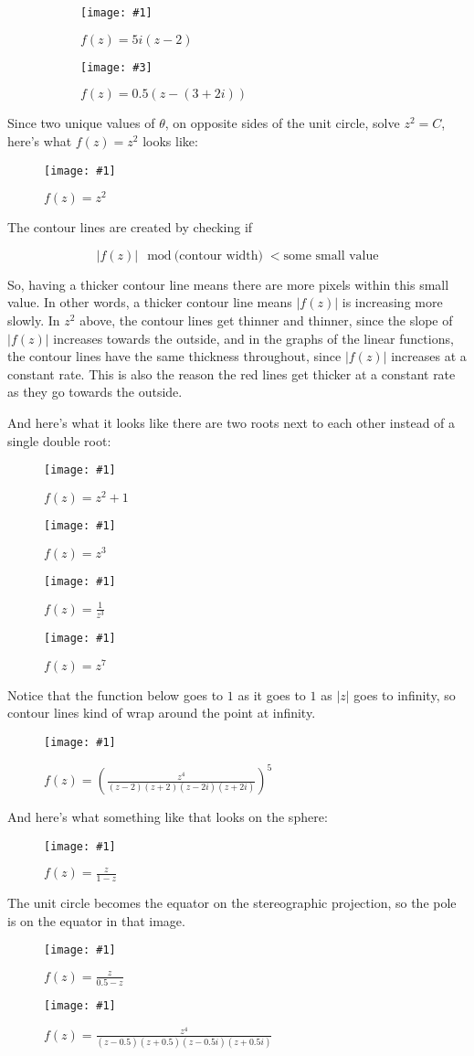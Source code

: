 \documentclass[xhtml, mathjax]{article}
\newcommand{\singleimage}[2] {
  \begin{figure}
    \centering
    \texttt{[image: \#1]}\par
    #2
  \end{figure}
}
\newcommand{\doubleimage}[4] {
  \begin{figure}
    \centering
    \begin{subfigure}{0.5\linewidth}
      \centering
      \texttt{[image: \#1]}\par
      #2
    \end{subfigure}
    \begin{subfigure}{0.5\linewidth}
      \centering
      \texttt{[image: \#3]}\par
      #4
    \end{subfigure}
  \end{figure}
}
\begin{document}
    \doubleimage{linear_1.gif}{$f(z)=5i(z-2)$}{linear_2.gif}{$f(z)=0.5(z-(3+2i))$}

    Since two unique values of $\theta$, on opposite sides of the unit circle,
    solve $z^2 = C$, here's what $f(z) = z^2$ looks like:

    \singleimage{poly_1.gif}{$f(z)=z^2$}

    The contour lines are created by checking if

    \[|f(z)| \mod \text{(contour width)} < \text{some small value}\]

    So, having a thicker contour line means there
    are more pixels within this small value. In other words, a thicker contour
    line means $|f(z)|$ is increasing more slowly. In $z^2$ above, the contour
    lines get thinner and thinner, since the slope of $|f(z)|$ increases towards
    the outside, and in the graphs of the linear functions, the contour lines
    have the same thickness throughout, since $|f(z)|$ increases at a constant
    rate. This is also the reason the red lines get thicker at a constant rate
    as they go towards the outside.

    And here's what it looks like there are two roots next to each other instead
    of a single double root:

    \singleimage{poly_2.gif}{$f(z)=z^2+1$}

    \singleimage{poly_3.gif}{$f(z)=z^3$}

    \singleimage{poly_7.gif}{$f(z)=\frac{1}{z^3}$}

    \singleimage{poly_4.gif}{$f(z)=z^7$}

    Notice that the function below goes to $1$ as it goes to $1$ as $|z|$ goes
    to infinity, so contour lines kind of wrap around the point at infinity.

    \singleimage{poly_5.gif}{$f(z)=\left(\frac{z^4}{(z-2)(z+2)(z-2i)(z+2i)}\right)^5$}

    And here's what something like that looks on the sphere:

    \singleimage{sphere_poly_2.gif}{$f(z)=\frac{z}{1-z}$}

    The unit circle becomes the equator on the stereographic projection, so the
    pole is on the equator in that image.

    \singleimage{sphere_poly_1.gif}{$f(z)=\frac{z}{0.5-z}$}

    \singleimage{sphere_poly_3.gif}{$f(z)=\frac{z^4}{(z - 0.5)(z + 0.5)(z -
    0.5i)(z + 0.5i)}$}
\end{document}
